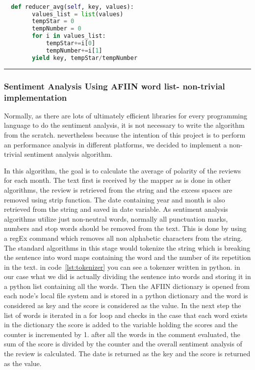\renewcommand{\lstlistingname}{Code}
\lstset{style=mystyle}
\begin{lstlisting}[language=Python, caption={The average starts given to each product by the reviewers, second reducer}, label={lst:starRed2}, mathescape = true, breaklines=true]

  def reducer_avg(self, key, values):
        values_list = list(values)
        tempStar = 0
        tempNumber = 0
        for i in values_list:
            tempStar+=i[0]
            tempNumber+=i[1]
        yield key, tempStar/tempNumber

\end{lstlisting}

\rule{200 pt}{0.5 pt}


\subsubsection{Sentiment Analysis Using AFIIN word list- non-trivial implementation}
Normally, as there are lots of ultimately efficient libraries for every programming language to do the sentiment analysis, it is not necessary to write the algorithm from the scratch. nevertheless because the intention of this project is to perform an performance analysis in different platforms, we decided to implement a non-trivial sentiment analysis algorithm.


In this algorithm, the goal is to calculate the average of polarity of the reviews for each month. The text first is received by the mapper as is done in other algorithms, the review is retrieved from the string and the excess spaces are removed using strip function. The date containing year and month is also retrieved from the string and saved in date variable. As sentiment analysis algorithms utilize just non-neutral words, normally all punctuation marks, numbers and stop words should be removed from the text. This is done by using a regEx command which removes all non alphabetic characters from the string. The standard algorithms in this stage would tokenize the string which is breaking the sentence into word maps containing the word and the number of its repetition in the text. in code~\ref{lst:tokenizer} you can see a tokenzer written in python.
in our case what we did is actually dividing the sentence into words and storing it in a python list containing all the words. Then the AFIIN dictionary is opened from each node's local file system and is stored in a python dictionary and the word is considered as key and the score is considered as the value. In the next step the list of words is iterated in a for loop and checks in the case that each word exists in the dictionary the score is added to the variable holding the scores and the counter is incremented by 1. after all the words in the comment evaluated, the sum of the score is divided by the counter and the overall sentiment analysis of the review is calculated. The date is returned as the key and the score is returned as the value. 

